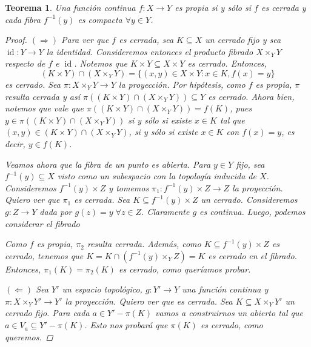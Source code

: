 \documentclass[12pt]{book}
\newtheorem{teo}{Teorema}[section]
\theoremstyle{definition}
\DeclareMathOperator{\id}{id}
\begin{document}
\begin{teo}
Una función continua $f:X\to Y$ es propia si y sólo si $f$ es cerrada y cada fibra $f^{-1}(y)$ es compacta $\forall y\in Y$.
\begin{proof}
$(\Longrightarrow)$ Para ver que $f$ es cerrada, sea $K\subseteq X$ un cerrado fijo y sea $\id:Y\to Y$ la identidad. Consideremos entonces el producto fibrado $X\times_Y Y$ respecto de $f$ e $\id$. Notemos que $K\times Y\subseteq X\times Y$ es cerrado. Entonces, $$(K\times Y)\cap (X\times_Y Y) = \{(x,y)\in X\times Y : x\in K, f(x)=y\}$$ es cerrado. Sea $\pi:X\times_Y Y\to Y$ la proyección. Por hipótesis, como $f$ es propia, $\pi$ resulta cerrada y así $\pi ((K\times Y)\cap (X\times_Y Y))\subseteq Y$ es cerrado. Ahora bien, notemos que vale que $\pi( (K\times Y)\cap (X\times_Y Y)) = f(K)$, pues $y\in \pi( (K\times Y)\cap (X\times_Y Y))$ si y sólo si existe $x\in K$ tal que $(x,y)\in (K\times Y)\cap (X\times_Y Y)$, si y sólo si existe $x\in K$ con $f(x)=y$, es decir, $y\in f(K)$.

Veamos ahora que la fibra de un punto es abierta. Para $y\in Y$ fijo, sea $f^{-1}(y)\subseteq X$ visto como un subespacio con la topología inducida de $X$. Consideremos $f^{-1}(y)\times Z$ y tomemos $\pi_1: f^{-1}(y)\times Z\to Z$ la proyección. Quiero ver que $\pi_1$ es cerrada. Sea $K\subseteq f^{-1}(y)\times Z$ un cerrado. Consideremos $g:Z\to Y$ dada por $g(z)=y\;\forall z\in Z$. Claramente $g$ es continua. Luego, podemos considerar el fibrado 
\begin{center}
\end{center} Como $f$ es propia, $\pi_2$ resulta cerrada. Además, como $K\subseteq f^{-1}(y)\times Z$ es cerrado, tenemos que $K = K\cap (f^{-1}(y)\times_Y Z) = K$ es cerrado en el fibrado. Entonces, $\pi_1(K)=\pi_2(K)$ es cerrado, como queríamos probar.

$(\Longleftarrow)$ Sea $Y'$ un espacio topológico, $g:Y'\to Y$ una función continua y $\pi: X\times_Y Y'\to Y'$ la proyección. Quiero ver que es cerrada. Sea $K\subseteq X\times_Y Y'$ un cerrado fijo. Para cada $a\in Y' - \pi(K)$ vamos a construirnos un abierto tal que $a\in V_a\subseteq Y'-\pi(K)$. Esto nos probará que $\pi(K)$ es cerrado, como queremos.


\end{proof}
\end{teo}
\end{document}
